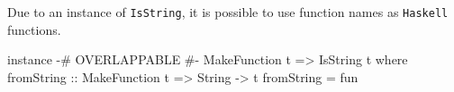 Due to an instance of \texttt{IsString}, it is possible to use function names as \texttt{Haskell} functions.

\begin{mycode}
instance {-# OVERLAPPABLE #-} MakeFunction t => IsString t where
  fromString :: MakeFunction t => String -> t
  fromString = fun
\end{mycode}



